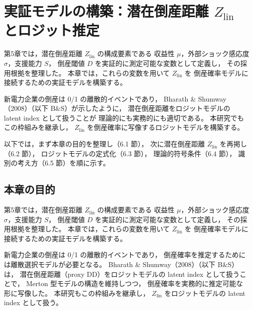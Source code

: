 
\chapter{実証モデルの構築：潜在倒産距離 $Z_{\text{lin}}$ とロジット推定}
\label{chap:empirical_model}

第5章では，潜在倒産距離 $Z_{\text{lin}}$ の構成要素である
収益性 $\mu$，外部ショック感応度 $\sigma$，支援能力 $S$，
倒産閾値 $D$ を実証的に測定可能な変数として定義し，
その採用根拠を整理した。
本章では，これらの変数を用いて $Z_{\text{lin}}$ を
倒産確率モデルに接続するための実証モデルを構築する。

新電力企業の倒産は 0/1 の離散的イベントであり，
Bharath \& Shumway（2008）（以下 B\&S）が示したように，
潜在倒産距離をロジットモデルの latent index として扱うことが
理論的にも実務的にも適切である。
本研究でもこの枠組みを継承し，
$Z_{\text{lin}}$ を倒産確率に写像するロジットモデルを構築する。

以下では，まず本章の目的を整理し（6.1 節），
次に潜在倒産距離 $Z_{\text{lin}}$ を再掲し（6.2 節），
ロジットモデルの定式化（6.3 節），
理論的符号条件（6.4 節），
識別の考え方（6.5 節）を順に示す。


\section{本章の目的}

第5章では，潜在倒産距離 $Z_{\text{lin}}$ の構成要素である
収益性 $\mu$，外部ショック感応度 $\sigma$，支援能力 $S$，
倒産閾値 $D$ を実証的に測定可能な変数として定義し，
その採用根拠を整理した。
本章では，これらの変数を用いて $Z_{\text{lin}}$ を
倒産確率モデルに接続するための実証モデルを構築する。

新電力企業の倒産は 0/1 の離散的イベントであり，
倒産確率を推定するためには離散選択モデルが必要となる。
Bharath \& Shumway（2008）（以下 B\&S）は，
潜在倒産距離（proxy DD）をロジットモデルの latent index として扱うことで，
Merton 型モデルの構造を維持しつつ，
倒産確率を実務的に推定可能な形に写像した。
本研究もこの枠組みを継承し，
$Z_{\text{lin}}$ をロジットモデルの latent index として扱う。


